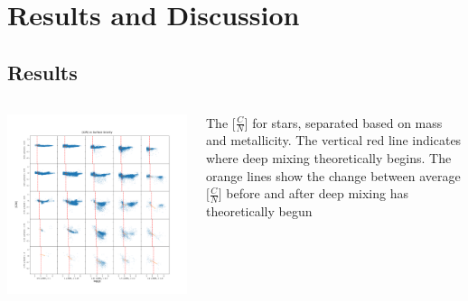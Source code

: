 \section{Results and Discussion}
\subsection{Results}
\begin{frame}
\begin{columns}
   
\begin{column}{0.7\textwidth}
    \includegraphics[width=.8\columnwidth]{Figures/DeepMixing.png}
\end{column}

\begin{column}{0.3\textwidth}
    The $\Big[\frac{C}{N}\Big]$ for stars, separated based on mass and metallicity. The vertical red line indicates where deep mixing theoretically begins. The orange lines show the change between average $\Big[\frac{C}{N}\Big]$ before and after deep mixing has theoretically begun
\end{column}
\end{columns}

\end{frame}
